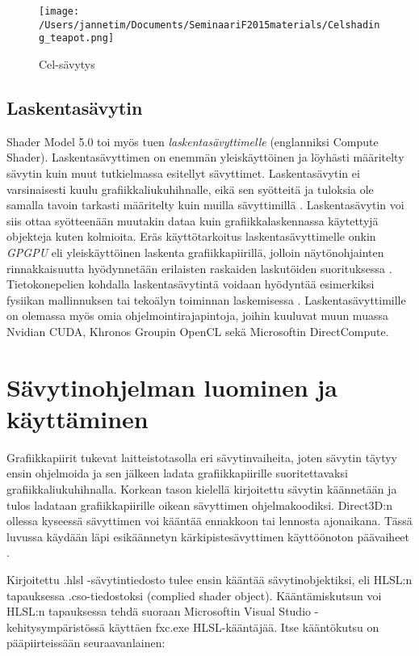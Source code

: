 \documentclass[finnish]{tktltiki2}
\theoremstyle{definition}
\theoremstyle{remark}
\begin{document}
\begin{figure}[!htbp]
\texttt{[image: /Users/jannetim/Documents/SeminaariF2015materials/Celshading\_teapot.png]}
\caption{Cel-sävytys}
\label{Cel}
\end{figure}

\subsection{Laskentasävytin}

Shader Model 5.0 toi myös tuen \emph{laskentasävyttimelle} (englanniksi Compute Shader). Laskentasävyttimen on enemmän yleiskäyttöinen ja löyhästi määritelty sävytin kuin muut tutkielmassa esitellyt sävyttimet. Laskentasävytin ei varsinaisesti kuulu grafiikkaliukuhihnalle, eikä sen syötteitä ja tuloksia ole samalla tavoin tarkasti määritelty kuin muilla sävyttimillä \cite{Kes14}. Laskentasävytin voi siis ottaa syötteenään muutakin dataa kuin grafiikkalaskennassa käytettyjä objekteja kuten kolmioita. Eräs käyttötarkoitus laskentasävyttimelle onkin \emph{GPGPU} eli yleiskäyttöinen laskenta grafiikkapiirillä, jolloin näytönohjainten rinnakkaisuutta hyödynnetään erilaisten raskaiden laskutöiden suorituksessa \cite{Uni15}. Tietokonepelien kohdalla laskentasävytintä voidaan hyödyntää esimerkiksi fysiikan mallinnuksen tai tekoälyn toiminnan laskemisessa \cite[Luku: Compute Shader Overview]{Mic11}. Laskentasävyttimille on olemassa myös omia ohjelmointirajapintoja, joihin kuuluvat muun muassa Nvidian CUDA, Khronos Groupin OpenCL sekä Microsoftin DirectCompute.

\section{Sävytinohjelman luominen ja käyttäminen}

Grafiikkapiirit tukevat laitteistotasolla eri sävytinvaiheita, joten sävytin täytyy ensin ohjelmoida ja sen jälkeen ladata grafiikkapiirille suoritettavaksi grafiikkaliukuhihnalla. Korkean tason kielellä kirjoitettu sävytin käännetään ja tulos ladataan grafiikkapiirille oikean sävyttimen ohjelmakoodiksi. Direct3D:n ollessa kyseessä sävyttimen voi kääntää ennakkoon tai lennosta ajonaikana. Tässä luvussa käydään läpi esikäännetyn kärkipistesävyttimen käyttöönoton päävaiheet \cite{Mic11}.

Kirjoitettu .hlsl -sävytintiedosto tulee ensin kääntää sävytinobjektiksi, eli HLSL:n tapauksessa .cso-tiedostoksi (complied shader object). Kääntämiskutsun voi HLSL:n tapauksessa tehdä suoraan Microsoftin Visual Studio -kehitysympäristössä käyttäen fxc.exe HLSL-kääntäjää. Itse kääntökutsu on pääpiirteissään seuraavanlainen:
\end{document}

